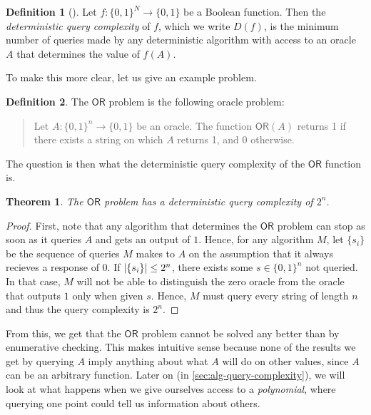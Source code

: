 \documentclass[english]{reedthesis}
\theoremstyle{plain}
\newtheorem{thm}{Theorem}[section]
\theoremstyle{definition}
\newtheorem{defn}[defn]{Definition}
\theoremstyle{remark}
\DeclarePairedDelimiter{\abs}{\lvert}{\rvert}
\begin{document}
\begin{defn}[{\cite[17]{AW09}}]\label{def:det-qc}
  Let $f: \{0, 1\}^{N} \rightarrow \{0, 1\}$ be a Boolean function. Then the
  \emph{deterministic query complexity} of $f$, which we write $D(f)$, is the
  minimum number of queries made by any deterministic algorithm with access to
  an oracle $A$ that determines the value of $f(A)$.
\end{defn}

To make this more clear, let us give an example problem.

\begin{defn}\label{def:or-problem}
  The $\mathsf{OR}$ problem is the following oracle problem:
  \begin{quote}
    Let $A: \{0, 1\}^{n} \rightarrow \{0, 1\}$ be an oracle. The function $\mathsf{OR}(A)$
    returns 1 if there exists a string on which $A$ returns 1, and $0$
    otherwise.
  \end{quote}
\end{defn}

The question is then what the deterministic query complexity of the
$\mathsf{OR}$ function is.

\begin{thm}
  The $\mathsf{OR}$ problem has a deterministic query complexity of $2^{n}$.
\end{thm}

\begin{proof}
  First, note that any algorithm that determines the $\mathsf{OR}$ problem can
  stop as soon as it queries $A$ and gets an output of $1$. Hence, for any
  algorithm $M$, let $\{s_{i}\}$ be the sequence of queries $M$ makes to $A$ on
  the assumption that it always recieves a response of $0$. If
  $\abs{\{s_{i}\}} \le 2^{n}$, there exists some $s \in \{0, 1\}^{n}$ not queried.
  In that case, $M$ will not be able to distinguish the zero oracle from the
  oracle that outputs $1$ only when given $s$. Hence, $M$ must query every
  string of length $n$ and thus the query complexity is $2^{n}$.
\end{proof}

From this, we get that the $\mathsf{OR}$ problem cannot be solved any better
than by enumerative checking. This makes intuitive sense because none of the
results we get by querying $A$ imply anything about what $A$ will do on other
values, since $A$ can be an arbitrary function. Later on (in
\cref{sec:alg-query-complexity}), we will look at what happens when we give
ourselves access to a \emph{polynomial}, where querying one point could tell us
information about others.
\end{document}
